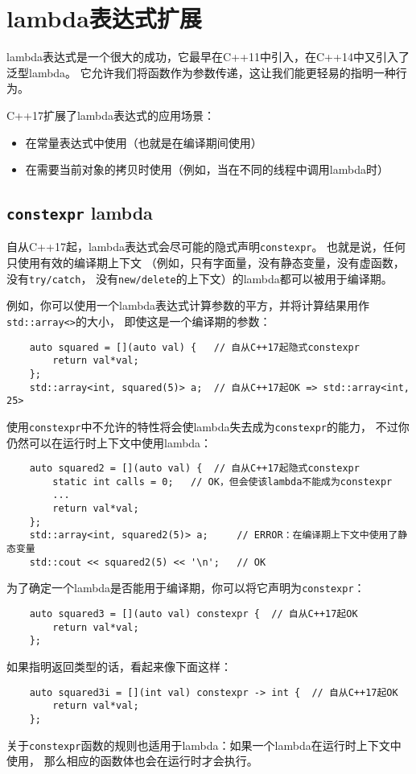 \chapter{lambda表达式扩展}\label{ch6}
lambda表达式是一个很大的成功，它最早在C++11中引入，在C++14中又引入了泛型lambda。
它允许我们将函数作为参数传递，这让我们能更轻易的指明一种行为。

C++17扩展了lambda表达式的应用场景：
\begin{itemize}
    \item 在常量表达式中使用（也就是在编译期间使用）
    \item 在需要当前对象的拷贝时使用（例如，当在不同的线程中调用lambda时）
\end{itemize}


\section{\texttt{constexpr} lambda}
自从C++17起，lambda表达式会尽可能的隐式声明\texttt{constexpr}。
也就是说，任何只使用有效的编译期上下文
（例如，只有字面量，没有静态变量，没有虚函数，没有\texttt{try/catch}，
没有\texttt{new/delete}的上下文）的lambda都可以被用于编译期。

例如，你可以使用一个lambda表达式计算参数的平方，并将计算结果用作\texttt{std::array<>}的大小，
即使这是一个编译期的参数：
\begin{lstlisting}
    auto squared = [](auto val) {   // 自从C++17起隐式constexpr
        return val*val;
    };
    std::array<int, squared(5)> a;  // 自从C++17起OK => std::array<int, 25>
\end{lstlisting}
使用\texttt{constexpr}中不允许的特性将会使lambda失去成为\texttt{constexpr}的能力，
不过你仍然可以在运行时上下文中使用lambda：
\begin{lstlisting}
    auto squared2 = [](auto val) {  // 自从C++17起隐式constexpr
        static int calls = 0;   // OK，但会使该lambda不能成为constexpr
        ...
        return val*val;
    };
    std::array<int, squared2(5)> a;     // ERROR：在编译期上下文中使用了静态变量
    std::cout << squared2(5) << '\n';   // OK
\end{lstlisting}
为了确定一个lambda是否能用于编译期，你可以将它声明为\texttt{constexpr}：
\begin{lstlisting}
    auto squared3 = [](auto val) constexpr {  // 自从C++17起OK
        return val*val;
    };
\end{lstlisting}
如果指明返回类型的话，看起来像下面这样：
\begin{lstlisting}
    auto squared3i = [](int val) constexpr -> int {  // 自从C++17起OK
        return val*val;
    };
\end{lstlisting}
关于\texttt{constexpr}函数的规则也适用于lambda：如果一个lambda在运行时上下文中使用，
那么相应的函数体也会在运行时才会执行。

